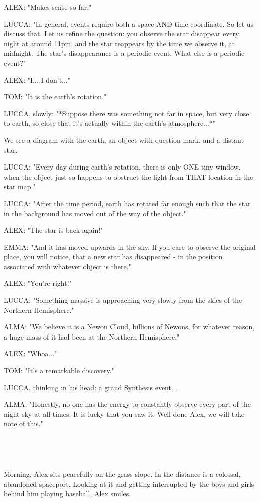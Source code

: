 \documentclass[11pt]{article}
\begin{document}
ALEX: "Makes sense so far."

LUCCA: "In general, events require both a space AND time coordinate.
So let us discuss that.
Let us refine the question: you observe the star disappear every night at around 11pm, and the star reappears by the time we observe it, at midnight.
The star's disappearance is a periodic event.
What else is a periodic event?"

ALEX: "I... I don't..."

TOM: "It is the earth's rotation."

LUCCA, slowly: "*Suppose there was something not far in space, but very close to earth, so close that it's actually within the earth's atmosphere...*"

We see a diagram with the earth, an object with question mark, and a distant star.

LUCCA: "Every day during earth's rotation, there is only ONE tiny window, when the object just so happens to obstruct the light from THAT location in the star map."

LUCCA: "After the time period, earth has rotated far enough such that the star in the background has moved out of the way of the object."

ALEX: "The star is back again!"

EMMA: "And it has moved upwards in the sky.
If you care to observe the original place, you will notice, that a new star has disappeared - in the position associated with whatever object is there."

ALEX: "You're right!"

LUCCA: "Something massive is approaching very slowly from the skies of the Northern Hemisphere."

ALMA: "We believe it is a Newon Cloud, billions of Newons, for whatever reason, a huge mass of it had been at the Northern Hemisphere."

ALEX: "Whoa..."

TOM: "It's a remarkable discovery."

LUCCA, thinking in his head: a grand Synthesis event...

ALMA: "Honestly, no one has the energy to constantly observe every part of the night sky at all times.
It is lucky that you saw it.
Well done Alex, we will take note of this."

\ 

\ 

Morning.
Alex sits peacefully on the grass slope.
In the distance is a colossal, abandoned spaceport.
Looking at it and getting interrupted by the boys and girls behind him playing baseball, Alex smiles.
\end{document}
